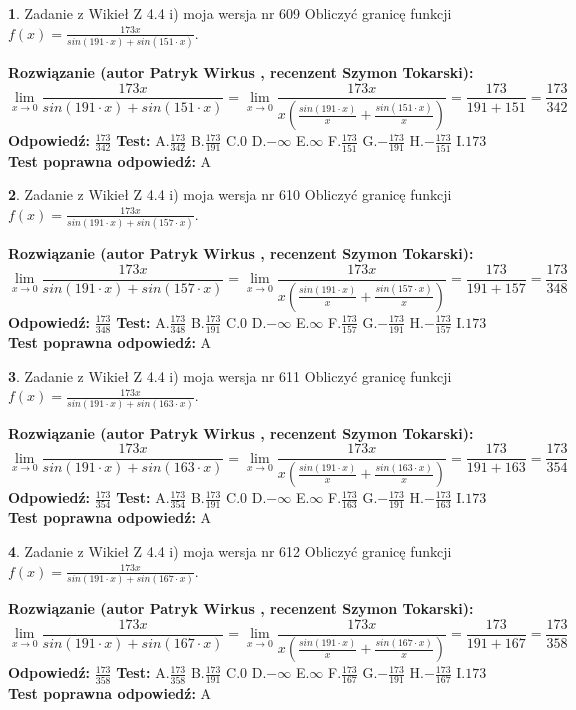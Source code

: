 \documentclass[12pt, a4paper]{article}
\theoremstyle{definition} %
\newtheorem{zad}{}
\newcommand{\zadStart}[1]{\begin{zad}#1\newline}
\newcommand{\zadStop}{\end{zad}}
\newcommand{\rozwStart}[2]{\noindent \textbf{Rozwiązanie (autor #1 , recenzent #2): }\newline}
\newcommand{\rozwStop}{\newline}
\newcommand{\odpStart}{\noindent \textbf{Odpowiedź:}\newline}
\newcommand{\odpStop}{\newline}
\newcommand{\testStart}{\noindent \textbf{Test:}\newline}
\newcommand{\testStop}{\newline}
\newcommand{\kluczStart}{\noindent \textbf{Test poprawna odpowiedź:}\newline}
\newcommand{\kluczStop}{\newline}
\begin{document}
\zadStart{Zadanie z Wikieł Z 4.4 i) moja wersja nr 609}
Obliczyć granicę funkcji $f(x)=\frac{173x}{sin(191\cdot x) +sin(151\cdot x)}$.
\zadStop
\rozwStart{Patryk Wirkus}{Szymon Tokarski}
$$\lim\limits_{x\to 0}\frac{173x}{sin(191\cdot x) +sin(151\cdot x)}=\lim\limits_{x\to 0}\frac{173x}{x(\frac{sin(191\cdot x)}{x}+\frac{sin(151\cdot x)}{x})}=\frac{173}{191+151} = \frac{173}{342}$$
\rozwStop
\odpStart
$\frac{173}{342}$
\odpStop
\testStart
A.$\frac{173}{342}$
B.$\frac{173}{191}$
C.$0$
D.$-\infty$
E.$\infty$
F.$\frac{173}{151}$
G.$-\frac{173}{191}$
H.$-\frac{173}{151}$
I.$173$
\testStop
\kluczStart
A
\kluczStop



\zadStart{Zadanie z Wikieł Z 4.4 i) moja wersja nr 610}
Obliczyć granicę funkcji $f(x)=\frac{173x}{sin(191\cdot x) +sin(157\cdot x)}$.
\zadStop
\rozwStart{Patryk Wirkus}{Szymon Tokarski}
$$\lim\limits_{x\to 0}\frac{173x}{sin(191\cdot x) +sin(157\cdot x)}=\lim\limits_{x\to 0}\frac{173x}{x(\frac{sin(191\cdot x)}{x}+\frac{sin(157\cdot x)}{x})}=\frac{173}{191+157} = \frac{173}{348}$$
\rozwStop
\odpStart
$\frac{173}{348}$
\odpStop
\testStart
A.$\frac{173}{348}$
B.$\frac{173}{191}$
C.$0$
D.$-\infty$
E.$\infty$
F.$\frac{173}{157}$
G.$-\frac{173}{191}$
H.$-\frac{173}{157}$
I.$173$
\testStop
\kluczStart
A
\kluczStop



\zadStart{Zadanie z Wikieł Z 4.4 i) moja wersja nr 611}
Obliczyć granicę funkcji $f(x)=\frac{173x}{sin(191\cdot x) +sin(163\cdot x)}$.
\zadStop
\rozwStart{Patryk Wirkus}{Szymon Tokarski}
$$\lim\limits_{x\to 0}\frac{173x}{sin(191\cdot x) +sin(163\cdot x)}=\lim\limits_{x\to 0}\frac{173x}{x(\frac{sin(191\cdot x)}{x}+\frac{sin(163\cdot x)}{x})}=\frac{173}{191+163} = \frac{173}{354}$$
\rozwStop
\odpStart
$\frac{173}{354}$
\odpStop
\testStart
A.$\frac{173}{354}$
B.$\frac{173}{191}$
C.$0$
D.$-\infty$
E.$\infty$
F.$\frac{173}{163}$
G.$-\frac{173}{191}$
H.$-\frac{173}{163}$
I.$173$
\testStop
\kluczStart
A
\kluczStop



\zadStart{Zadanie z Wikieł Z 4.4 i) moja wersja nr 612}
Obliczyć granicę funkcji $f(x)=\frac{173x}{sin(191\cdot x) +sin(167\cdot x)}$.
\zadStop
\rozwStart{Patryk Wirkus}{Szymon Tokarski}
$$\lim\limits_{x\to 0}\frac{173x}{sin(191\cdot x) +sin(167\cdot x)}=\lim\limits_{x\to 0}\frac{173x}{x(\frac{sin(191\cdot x)}{x}+\frac{sin(167\cdot x)}{x})}=\frac{173}{191+167} = \frac{173}{358}$$
\rozwStop
\odpStart
$\frac{173}{358}$
\odpStop
\testStart
A.$\frac{173}{358}$
B.$\frac{173}{191}$
C.$0$
D.$-\infty$
E.$\infty$
F.$\frac{173}{167}$
G.$-\frac{173}{191}$
H.$-\frac{173}{167}$
I.$173$
\testStop
\kluczStart
A
\kluczStop
\end{document}

